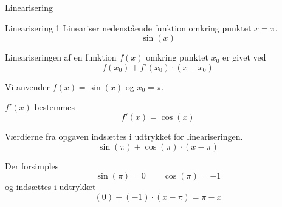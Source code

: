 \documentclass{article}
\begin{document}
Linearisering
\tableofcontents
\newpage


\begin{exercise}{Linearisering 1}
Lineariser nedenstående funktion omkring punktet $x = \pi$.
\[
\sin(x)
\]


\hint
Lineariseringen af en funktion $f(x)$
omkring punktet $x_0$ er givet ved
\[
f(x_0) + f'(x_0) \cdot (x - x_0)
\]

\hint
Vi anvender $f(x) = \sin(x)$ og $x_0 = \pi$.

\hint
$f'(x)$ bestemmes
\[
f'(x) = \cos(x)
\]

\hint
Værdierne fra opgaven indsættes i udtrykket for lineariseringen.
\[
\sin(\pi) + \cos(\pi) \cdot (x - \pi)
\]

\hint
Der forsimples
\[
\sin(\pi) = 0 \qquad 
\cos(\pi) = -1
\]
og indsættes i udtrykket
\[
(0) + (-1) \cdot (x - \pi) = 
\pi - x
\]

\end{exercise}
\end{document}
